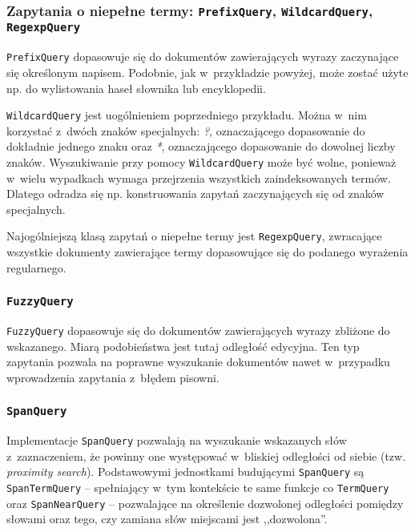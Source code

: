 \subsubsection{Zapytania o niepełne termy: \texttt{PrefixQuery}, \texttt{WildcardQuery}, \texttt{RegexpQuery}}

\texttt{PrefixQuery} dopasowuje się do dokumentów zawierających wyrazy zaczynające się określonym napisem. Podobnie, jak w~przykładzie powyżej, może zostać użyte np. do wylistowania haseł słownika lub encyklopedii.

\texttt{WildcardQuery} jest uogólnieniem poprzedniego przykładu. Można w~nim korzystać z~dwóch znaków specjalnych: \emph{?}, oznaczającego dopasowanie do dokładnie jednego znaku oraz \emph{*}, oznaczającego dopasowanie do dowolnej liczby znaków. Wyszukiwanie przy pomocy \texttt{WildcardQuery} może być wolne, ponieważ w~wielu wypadkach wymaga przejrzenia wszystkich zaindeksowanych termów. Dlatego odradza się np. konstruowania zapytań zaczynających się od znaków specjalnych.

Najogólniejszą klasą zapytań o niepełne termy jest \texttt{RegexpQuery}, zwracające wszystkie dokumenty zawierające termy dopasowujące się do podanego wyrażenia regularnego.

\subsubsection{\texttt{FuzzyQuery}}

\texttt{FuzzyQuery} dopasowuje się do dokumentów zawierających wyrazy zbliżone do wskazanego. Miarą podobieństwa jest tutaj odległość edycyjna. Ten typ zapytania pozwala na poprawne wyszukanie dokumentów nawet w~przypadku wprowadzenia zapytania z~błędem pisowni.

\subsubsection{\texttt{SpanQuery}}

Implementacje \texttt{SpanQuery} pozwalają na wyszukanie wskazanych słów z~zaznaczeniem, że powinny one występować w~bliskiej odległości od siebie (tzw. \emph{proximity search}). Podstawowymi jednostkami budującymi \texttt{SpanQuery} są \texttt{SpanTermQuery} -- spełniający w~tym kontekście te same funkcje co \texttt{TermQuery} oraz \texttt{SpanNearQuery} -- pozwalające na określenie dozwolonej odległości pomiędzy słowami oraz tego, czy zamiana słów miejscami jest ,,dozwolona''.

